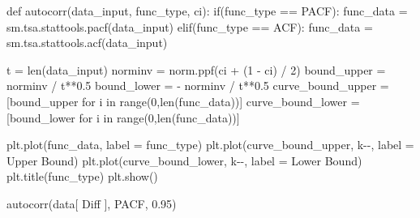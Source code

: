 \documentclass[
  letterpaper,
  DIV=11,
  numbers=noendperiod]{scrartcl}
\newenvironment{Shaded}{\begin{snugshade}}{\end{snugshade}}
\newcommand{\BuiltInTok}[1]{\textcolor[rgb]{0.00,0.23,0.31}{#1}}
\newcommand{\ControlFlowTok}[1]{\textcolor[rgb]{0.00,0.23,0.31}{#1}}
\newcommand{\DecValTok}[1]{\textcolor[rgb]{0.68,0.00,0.00}{#1}}
\newcommand{\FloatTok}[1]{\textcolor[rgb]{0.68,0.00,0.00}{#1}}
\newcommand{\KeywordTok}[1]{\textcolor[rgb]{0.00,0.23,0.31}{#1}}
\newcommand{\NormalTok}[1]{\textcolor[rgb]{0.00,0.23,0.31}{#1}}
\newcommand{\OperatorTok}[1]{\textcolor[rgb]{0.37,0.37,0.37}{#1}}
\newcommand{\StringTok}[1]{\textcolor[rgb]{0.13,0.47,0.30}{#1}}
\begin{document}
\begin{Shaded}
\begin{Highlighting}[]
\KeywordTok{def}\NormalTok{ autocorr(data\_input, func\_type, ci):}
    \ControlFlowTok{if}\NormalTok{(func\_type }\OperatorTok{==} \StringTok{\textquotesingle{}PACF\textquotesingle{}}\NormalTok{):}
\NormalTok{        func\_data }\OperatorTok{=}\NormalTok{ sm.tsa.stattools.pacf(data\_input)}
    \ControlFlowTok{elif}\NormalTok{(func\_type }\OperatorTok{==} \StringTok{\textquotesingle{}ACF\textquotesingle{}}\NormalTok{):}
\NormalTok{        func\_data }\OperatorTok{=}\NormalTok{ sm.tsa.stattools.acf(data\_input)}
    
\NormalTok{    t }\OperatorTok{=} \BuiltInTok{len}\NormalTok{(data\_input)}
\NormalTok{    norminv }\OperatorTok{=}\NormalTok{ norm.ppf(ci }\OperatorTok{+}\NormalTok{ (}\DecValTok{1} \OperatorTok{{-}}\NormalTok{ ci) }\OperatorTok{/} \DecValTok{2}\NormalTok{)}
\NormalTok{    bound\_upper }\OperatorTok{=}\NormalTok{ norminv }\OperatorTok{/}\NormalTok{ t}\OperatorTok{**}\FloatTok{0.5}
\NormalTok{    bound\_lower }\OperatorTok{=} \OperatorTok{{-}}\NormalTok{ norminv }\OperatorTok{/}\NormalTok{ t}\OperatorTok{**}\FloatTok{0.5}
\NormalTok{    curve\_bound\_upper }\OperatorTok{=}\NormalTok{ [bound\_upper }\ControlFlowTok{for}\NormalTok{ i }\KeywordTok{in} \BuiltInTok{range}\NormalTok{(}\DecValTok{0}\NormalTok{,}\BuiltInTok{len}\NormalTok{(func\_data))]}
\NormalTok{    curve\_bound\_lower }\OperatorTok{=}\NormalTok{ [bound\_lower }\ControlFlowTok{for}\NormalTok{ i }\KeywordTok{in} \BuiltInTok{range}\NormalTok{(}\DecValTok{0}\NormalTok{,}\BuiltInTok{len}\NormalTok{(func\_data))]}
    
\NormalTok{    plt.plot(func\_data, label }\OperatorTok{=}\NormalTok{ func\_type)}
\NormalTok{    plt.plot(curve\_bound\_upper, }\StringTok{\textquotesingle{}k{-}{-}\textquotesingle{}}\NormalTok{, label }\OperatorTok{=} \StringTok{\textquotesingle{}Upper Bound\textquotesingle{}}\NormalTok{)}
\NormalTok{    plt.plot(curve\_bound\_lower, }\StringTok{\textquotesingle{}k{-}{-}\textquotesingle{}}\NormalTok{, label }\OperatorTok{=} \StringTok{\textquotesingle{}Lower Bound\textquotesingle{}}\NormalTok{)}
\NormalTok{    plt.title(func\_type)}
\NormalTok{    plt.show()}
\end{Highlighting}
\end{Shaded}

\begin{Shaded}
\begin{Highlighting}[]
\NormalTok{autocorr(data[ }\StringTok{\textquotesingle{}Diff\textquotesingle{}}\NormalTok{ ], }\StringTok{\textquotesingle{}PACF\textquotesingle{}}\NormalTok{, }\FloatTok{0.95}\NormalTok{)}
\end{Highlighting}
\end{Shaded}
\end{document}
